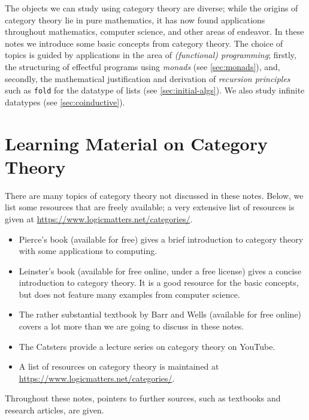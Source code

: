 \documentclass[a4paper,11pt, oneside,titlepage=false]{scrbook}
\theoremstyle{plain}
\theoremstyle{definition}
\begin{document}
The objects we can study using category theory are diverse;
while the origins of category theory lie in pure mathematics, it has now found applications throughout mathematics, computer science, and other areas of endeavor.
In these notes we introduce some basic concepts from category theory.
The choice of topics is guided by applications in the area of \emph{(functional) programming}; firstly, the structuring of effectful programs using \emph{monads} (see \cref{sec:monads}), and, secondly, the mathematical justification and derivation of \emph{recursion principles} such as \verb!fold! for the datatype of lists (see \cref{sec:initial-algs}).
We also study infinite datatypes (see \cref{sec:coinductive}).


\section{Learning Material on Category Theory}
\label{sec:material}


There are many topics of category theory not discussed in these notes.
Below, we list some resources that are freely available;
a very extensive list of resources is given at \url{https://www.logicmatters.net/categories/}.

\begin{itemize}
\item Pierce's book \cite{pierce} (available for free) gives a brief introduction to category theory with some applications to computing.

\item Leinster's book \cite{leinster} (available for free online, under a free license) gives a concise introduction to category theory.
It is a good resource for the basic concepts, but does not feature many examples from computer science.

\item The rather substantial textbook by Barr and Wells \cite{barr-wells} (available for free online) covers a lot more than we are going to discuss in these notes.

\item The Catsters \cite{catsters} provide a lecture series on category theory on YouTube.

\item A list of resources on category theory is maintained at \url{https://www.logicmatters.net/categories/}.
\end{itemize}

Throughout these notes, pointers to further sources, such as textbooks and research articles, are given.
\end{document}
